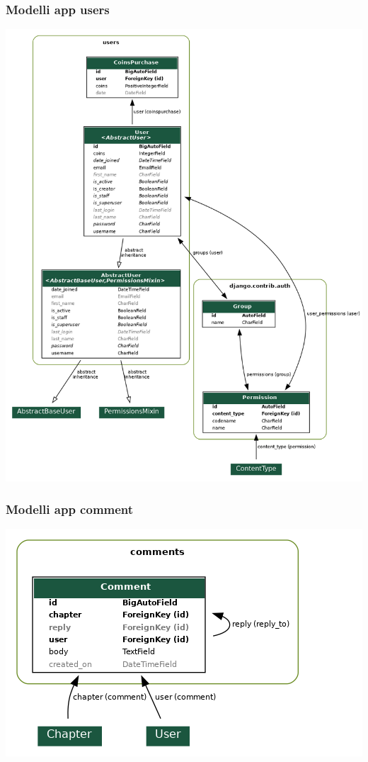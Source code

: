 \subsubsection{Modelli app users}
\begin{center}
  \includegraphics[width=1.0\linewidth]{images/users.png}
\end{center}

\subsubsection{Modelli app comment}
\begin{center}
  \includegraphics[width=1.0\linewidth]{images/comments.png}
\end{center}

